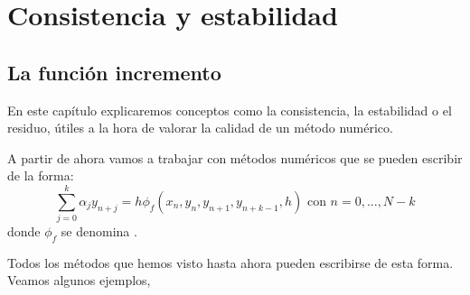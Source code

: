 \documentclass{apuntes}
\begin{document}
\chapter{Consistencia y estabilidad}
\section{La función incremento}
En este capítulo explicaremos conceptos como la consistencia, la estabilidad o el residuo, útiles a la hora de valorar la calidad de un método numérico.

A partir de ahora vamos a trabajar con métodos numéricos que se pueden escribir de la forma:
\[\sum_{j=0}^k α_jy_{n+j} = h \phi_f(x_n,y_n,y_{n+1},y_{n+k-1},h) \text{ con } n=0,...,N - k\]
donde $\phi_f$ se denomina .

\obs Todos los métodos que hemos visto hasta ahora pueden escribirse de esta forma. Veamos algunos ejemplos,
\end{document}
